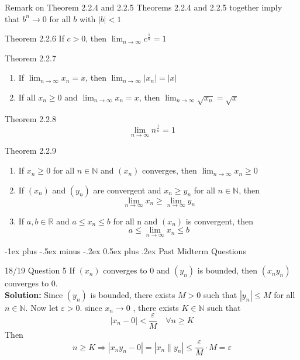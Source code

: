 \documentclass[10pt,landscape]{article}
\makeatletter
\renewcommand{\section}{\@startsection{section}{1}{0mm}%
                                {-1ex plus -.5ex minus -.2ex}%
                                {0.5ex plus .2ex}%
                                {\normalfont\large\bfseries}}
\theoremstyle{definition}
\newcommand{\thistheoremname}{}
\newtheorem*{genericthm*}{\thistheoremname}
\newenvironment{namedthm*}[1]
{\renewcommand{\thistheoremname}{#1}\begin{genericthm*}}
{\end{genericthm*}}
\makeatother
\begin{document}
\begin{multicols}{3}
\begin{namedthm*}{Remark on Theorem 2.2.4 and 2.2.5}
   Theorems 2.2.4 and 2.2.5 together imply that $b^n \rightarrow 0$ for all $b$ with $|b| < 1$
\end{namedthm*}


\begin{namedthm*}{Theorem 2.2.6}
    If $c > 0$, then $\lim_{n \rightarrow \infty}c^{\frac{1}{n}}=1$
\end{namedthm*}

\begin{namedthm*}{Theorem 2.2.7}
    ~
    \begin{enumerate}
        \item If $\lim_{n \rightarrow \infty}{x_{n}} = x$, then $\lim_{n \rightarrow \infty}{|x_{n}|} = |x|$ 
        \item If all $x_{n} \geq 0$ and $\lim_{n \rightarrow \infty}{x_{n}} = x$, then $\lim_{n \rightarrow \infty}{\sqrt{x_{n}}} = \sqrt{x}$  
    \end{enumerate}
\end{namedthm*}

\begin{namedthm*}{Theorem 2.2.8}
  $$\lim_{n \rightarrow \infty}{n^{\frac{1}{n}}}=1$$
\end{namedthm*}


\begin{namedthm*}{Theorem 2.2.9}
    ~
    \begin{enumerate}
        \item If $x_{n} \geq 0$ for all $n \in \mathbb{N}$ and $(x_n)$ converges, then $\lim_{n \rightarrow \infty}{x_{n}} \geq 0$
        \item If $(x_{n})$ and $(y_{n})$ are convergent and $x_{n} \geq y_{n}$ for all $n \in \mathbb{N}$, then $$\lim_{n \rightarrow \infty}{x_{n}} \geq \lim_{n \rightarrow \infty}{y_{n}}$$
        \item If $a,b \in \mathbb{R}$ and $a \leq x_{n} \leq b$ for all n and $(x_n)$ is convergent, then $$ a \leq \lim_{n \rightarrow \infty}{x_{n}} \leq b$$
    \end{enumerate}
\end{namedthm*}

\section{Past Midterm Questions}
\begin{namedthm*}{18/19 Question 5}
If $\left(x_{n}\right)$ converges to 0 and $\left(y_{n}\right)$ is bounded, then $\left(x_{n} y_{n}\right)$ converges to $0 .$\\
\textbf{Solution:} Since $\left(y_{n}\right)$ is bounded, there exists $M>0$ such that $\left|y_{n}\right| \leq M$ for all $n \in \mathbb{N} .$ Now
let $\varepsilon>0 .$ since $x_{n} \rightarrow 0$ , there exists $K \in \mathbb{N}$ such that
\[
\left|x_{n}-0\right|<\frac{\varepsilon}{M} \quad \forall n \geq K
\]
Then
\[
n \geq K \Longrightarrow\left|x_{n} y_{n}-0\right|=\left|x_{n} \| y_{n}\right| \leq \frac{\varepsilon}{M} \cdot M=\varepsilon
\]
\end{namedthm*}


\end{multicols}
\end{document}
